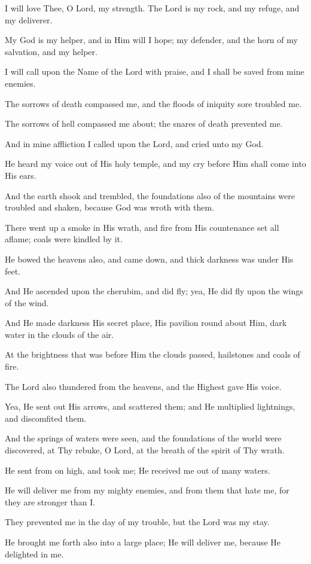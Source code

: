 I will love Thee, O Lord, my strength. The Lord is my rock, and my refuge, and my deliverer.

My God is my helper, and in Him will I hope; my defender, and the horn of my salvation, and my helper.

I will call upon the Name of the Lord with praise, and I shall be saved from mine enemies.

The sorrows of death compassed me, and the floods of iniquity sore troubled me.

The sorrows of hell compassed me about; the snares of death prevented me.

And in mine affliction I called upon the Lord, and cried unto my God.

He heard my voice out of His holy temple, and my cry before Him shall come into His ears.

And the earth shook and trembled, the foundations also of the mountains were troubled and shaken, because God was wroth with them.

There went up a smoke in His wrath, and fire from His countenance set all aflame; coals were kindled by it.

He bowed the heavens also, and came down, and thick darkness was under His feet.

And He ascended upon the cherubim, and did fly; yea, He did fly upon the wings of the wind.

And He made darkness His secret place, His pavilion round about Him, dark water in the clouds of the air.

At the brightness that was before Him the clouds passed, hailstones and coals of fire.

The Lord also thundered from the heavens, and the Highest gave His voice.

Yea, He sent out His arrows, and scattered them; and He multiplied lightnings, and discomfited them.

And the springs of waters were seen, and the foundations of the world were discovered, at Thy rebuke, O Lord, at the breath of the spirit of Thy wrath.

He sent from on high, and took me; He received me out of many waters.

He will deliver me from my mighty enemies, and from them that hate me, for they are stronger than I.

They prevented me in the day of my trouble, but the Lord was my stay.

He brought me forth also into a large place; He will deliver me, because He delighted in me.

